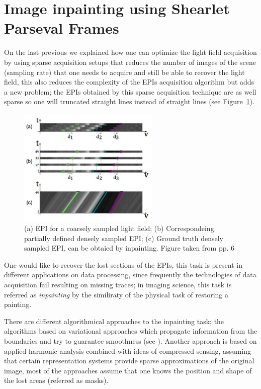 \section{Image inpainting using Shearlet Parseval Frames}
\label{sec:shearlet_parseval_inpainting}

On the last previous we explained how one can optimize the light field acquisition by using sparse acquisition setups that reduces the number of images of the scene (sampling rate) that one needs to acquire and still be able to recover the light field, this also reduces the complexity of the EPIs acquisition algorithm but adds a new problem; the EPIs obtained by this sparse acquisition technique are as well sparse so one will truncated straight lines instead of straight lines (see Figure~\ref{fig:sparse_EPI}). 

\begin{figure}[h!]
\centering
\includegraphics[width=0.6\textwidth]{./Diagrams/sparse_EPI.jpg}
\caption{(a) EPI for a coarsely sampled light field; (b) Correspondeing partially defined densely sampled EPI; (c) Ground truth densely sampled EPI, can be obtaied by inpainting. Figure taken from \cite{LF-Shearlets} pp. 6}
\label{fig:sparse_EPI}
\end{figure}

One would like to recover the lost sections of the EPIs, this task is present in different applications on data processing, since frequently the technologies of data acquisition fail resulting on missing traces; in imaging science, this task is referred as \textit{inpainting} by the similiraty of the physical task of restoring a painting. 

\bigskip

There are different algorithmical approaches to the inpainting task; the algorithms based on variational approaches which propagate information from the boundaries and try to guarantee smoothness (see \cite{Ballester}). Another approach is based on applied harmonic analysis combined with ideas of compressed sensing, assuming that certain representation systems provide sparse approximations of the original image, most of the approaches assume that one knows the position and shape of the lost areas (referred as masks).

